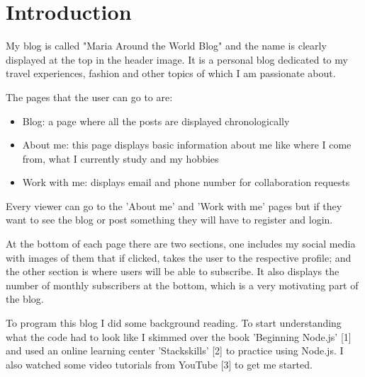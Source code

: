 \documentclass[10pt, a4paper]{article}
\title{\mytitle}
\author{\myauthor\hspace{1em}\\\contact\\Edinburgh Napier University\hspace{0.5em}-\hspace{0.5em}\mymodule}
\date{}
\begin{document}
	\maketitle
	\begin{abstract}
	    In this coursework the aim is to design and code a blog journal. A blog is an informational website where the owner or owners of the blog share their views on a subject. The posts might be all related, for example if the blog is a fashion blog, the posts will all have different outfits, or makeup tutorials, etc... Or each post might be of a different topic. The website displays the posts in order, with the latest post at the top, so viewers keep up to date with it.
	\end{abstract}


	\section{Introduction}
	My blog is called "Maria Around the World Blog" and the name is clearly displayed at the top in the header image. It is a personal blog dedicated to my travel experiences, fashion and other topics of which I am passionate about.

	The pages that the user can go to are:

	\begin{itemize}
        \item Blog: a page where all the posts are displayed chronologically
        \item About me: this page displays basic information about me like where I come from, what I currently study and my hobbies
        \item Work with me: displays email and phone number for collaboration requests
    \end{itemize}

    Every viewer can go to the 'About me' and 'Work with me' pages but if they want to see the blog or post something they will have to register and login.

    At the bottom of each page there are two sections, one includes my social media with images of them that if clicked, takes the user to the respective profile; and the other section is where users will be able to subscribe. It also displays the number of monthly subscribers at the bottom, which is a very motivating part of the blog.

    To program this blog I did some background reading. To start understanding what the code had to look like I skimmed over the book 'Beginning Node.js' [1] and used an online learning center 'Stackskills' [2] to practice using Node.js. I also watched some video tutorials from YouTube [3] to get me started.
\end{document}
